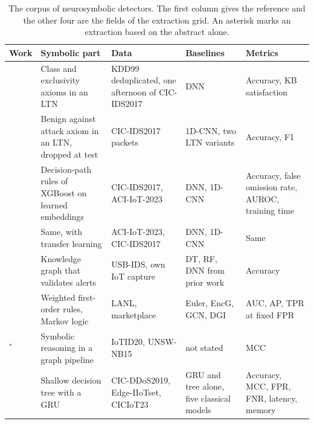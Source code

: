 \begin{table}[htbp]
\centering
\footnotesize
\setlength{\tabcolsep}{3pt}
\caption{The corpus of neurosymbolic detectors. The first column gives the
reference and the other four are the fields of the extraction grid. An
asterisk marks an extraction based on the abstract alone.}
\label{tab:nesy-nids-grid}
\begin{tabular}{@{}p{2.3cm}p{3.2cm}p{2.6cm}p{1.9cm}p{2.0cm}@{}}
\toprule
Work & Symbolic part & Data & Baselines & Metrics \\
\midrule
\citet{onchis2022neurosymbolic}
  & Class and exclusivity axioms in an LTN
  & KDD99 deduplicated, one afternoon of CIC-IDS2017
  & DNN
  & Accuracy, KB satisfaction \\
\citet{bizzarri2024nsaids}
  & Benign against attack axiom in an LTN, dropped at test
  & CIC-IDS2017 packets
  & 1D-CNN, two LTN variants
  & Accuracy, F1 \\
\citet{tran2025odxu}
  & Decision-path rules of XGBoost on learned embeddings
  & CIC-IDS2017, ACI-IoT-2023
  & DNN, 1D-CNN
  & Accuracy, false omission rate, AUROC, training time \\
\citet{tran2025transfer}
  & Same, with transfer learning
  & ACI-IoT-2023, CIC-IDS2017
  & DNN, 1D-CNN
  & Same \\
\citet{kalutharage2025neurosymbolic}
  & Knowledge graph that validates alerts
  & USB-IDS, own IoT capture
  & DT, RF, DNN from prior work
  & Accuracy \\
\citet{zhou2024knowgraph}
  & Weighted first-order rules, Markov logic
  & LANL, marketplace
  & Euler, EncG, GCN, DGI
  & AUC, AP, TPR at fixed FPR \\
\citet{aresrobledo2025hyperparameter}$^{*}$
  & Symbolic reasoning in a graph pipeline
  & IoTID20, UNSW-NB15
  & not stated
  & MCC \\
\citet{alemayehu2026deployment}
  & Shallow decision tree with a GRU
  & CIC-DDoS2019, Edge-IIoTset, CICIoT23
  & GRU and tree alone, five classical models
  & Accuracy, MCC, FPR, FNR, latency, memory \\
\bottomrule
\end{tabular}
\end{table}

